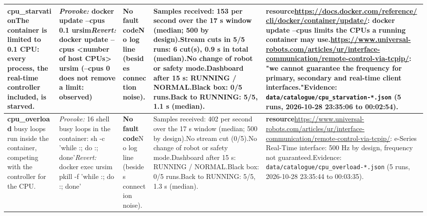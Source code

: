 \documentclass[10pt]{article}
\begin{document}
\begin{longtable}{@{}>{\raggedright\arraybackslash}p{2.7cm}>{\raggedright\arraybackslash}p{4.0cm}>{\raggedright\arraybackslash}p{7.6cm}>{\raggedright\arraybackslash}p{5.2cm}>{\raggedright\arraybackslash}p{6.0cm}@{}}
\textbf{cpu\_\allowbreak{}starvation}\newline The container is limited to 0.1 CPU: every process,\allowbreak{} the real-time controller included,\allowbreak{} is starved. & \textit{Provoke:} docker update --cpus 0.1 ursim\newline\textit{Revert:} docker update --cpus <number of host CPUs> ursim  (--cpus 0 does not remove a limit: observed) & \textbf{No fault code}\newline No log line (besides connection noise). & Samples received: 153 per second over the 17 s window (median; 500 by design).\newline Stream cuts in 5/5 runs: 6 cut(s), 0.9 s in total (median).\newline No change of robot or safety mode.\newline Dashboard after 15 s: RUNNING / NORMAL.\newline Black box: 0/5 runs.\newline Back to RUNNING: 5/5, 1.1 s (median). & \textbf{resource}\newline \url{https://docs.docker.com/reference/cli/docker/container/update/}: docker update --cpus limits the CPUs a running container may use.\newline \url{https://www.universal-robots.com/articles/ur/interface-communication/remote-control-via-tcpip/}: "we cannot guarantee the frequency for primary,\allowbreak{} secondary and real-time client interfaces."\newline Evidence: \texttt{data/catalogue/cpu\_\allowbreak{}starvation-*.json} (5 runs, 2026-10-28 23:35:06 to 00:02:54). \\ \midrule
\textbf{cpu\_\allowbreak{}overload}\newline 16 busy loops run inside the container,\allowbreak{} competing with the controller for the CPU. & \textit{Provoke:} 16 shell busy loops in the container: sh -c 'while :; do :; done'\newline\textit{Revert:} docker exec ursim pkill -f 'while :; do :; done' & \textbf{No fault code}\newline No log line (besides connection noise). & Samples received: 402 per second over the 17 s window (median; 500 by design).\newline No stream cut (0/5).\newline No change of robot or safety mode.\newline Dashboard after 15 s: RUNNING / NORMAL.\newline Black box: 0/5 runs.\newline Back to RUNNING: 5/5, 1.3 s (median). & \textbf{resource}\newline \url{https://www.universal-robots.com/articles/ur/interface-communication/remote-control-via-tcpip/}: e-Series Real-Time interface: 500 Hz by design,\allowbreak{} frequency not guaranteed.\newline Evidence: \texttt{data/catalogue/cpu\_\allowbreak{}overload-*.json} (5 runs, 2026-10-28 23:35:44 to 00:03:35). \\ \midrule

\end{longtable}
\end{document}
